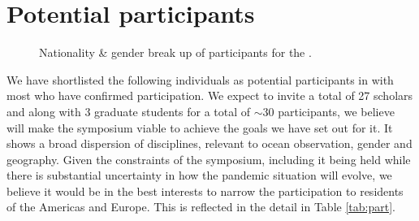 \section{Potential participants}
\label{sec:part}

\begin{figure}[!b]
  \vspace{-0.5cm}
  \centering 
  \caption{Nationality \& gender break up of participants for the
    \sympe.}
  \label{fig:country}
\end{figure}

We have shortlisted the following individuals as potential
participants in \symp with most who have confirmed participation. We
expect to invite a total of 27 scholars and along with 3 graduate
students for a total of $\sim 30$ participants, we believe will make
the symposium viable to achieve the goals we have set out for it. It
shows a broad dispersion of disciplines, relevant to ocean
observation, gender and geography. Given the constraints of the
symposium, including it being held while there is substantial
uncertainty in how the pandemic situation will evolve, we believe it
would be in the best interests to narrow the participation to
residents of the Americas and Europe. This is reflected in the detail
in Table \ref{tab:part}. %


